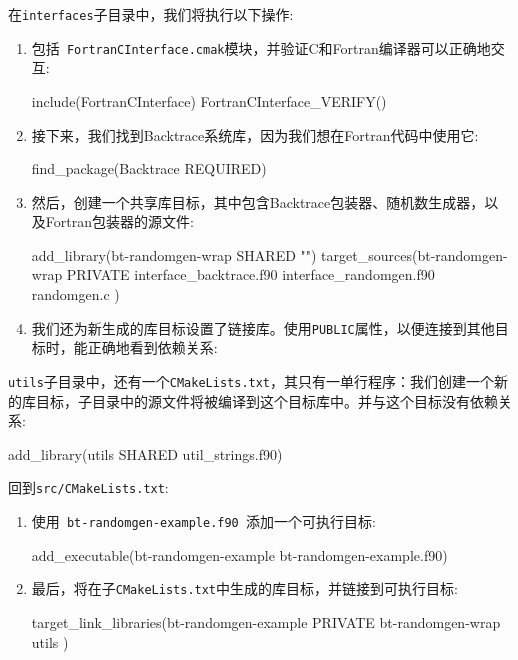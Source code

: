 在\texttt{interfaces}子目录中，我们将执行以下操作:

\begin{enumerate}
\item 包括\texttt{ FortranCInterface.cmak}模块，并验证C和Fortran编译器可以正确地交互:

\begin{codebox}[cmake]
include(FortranCInterface)
FortranCInterface_VERIFY()
\end{codebox}

\item 接下来，我们找到Backtrace系统库，因为我们想在Fortran代码中使用它:

\begin{codebox}[cmake]
find_package(Backtrace REQUIRED)
\end{codebox}

\item 然后，创建一个共享库目标，其中包含Backtrace包装器、随机数生成器，以及Fortran包装器的源文件:

\begin{codebox}[cmake]
add_library(bt-randomgen-wrap SHARED "")
target_sources(bt-randomgen-wrap
  PRIVATE
    interface_backtrace.f90
    interface_randomgen.f90
    randomgen.c
  )
\end{codebox}

\item 我们还为新生成的库目标设置了链接库。使用\texttt{PUBLIC}属性，以便连接到其他目标时，能正确地看到依赖关系:


\end{enumerate}

\texttt{utils}子目录中，还有一个\texttt{CMakeLists.txt}，其只有一单行程序：我们创建一个新的库目标，子目录中的源文件将被编译到这个目标库中。并与这个目标没有依赖关系:

\begin{codebox}[cmake]
add_library(utils SHARED util_strings.f90)
\end{codebox}

回到\texttt{src/CMakeLists.txt}:

\begin{enumerate}
\item 使用\texttt{ bt-randomgen-example.f90 }添加一个可执行目标:

\begin{codebox}[cmake]
add_executable(bt-randomgen-example bt-randomgen-example.f90)
\end{codebox}

\item 最后，将在子\texttt{CMakeLists.txt}中生成的库目标，并链接到可执行目标:

\begin{codebox}[cmake]
target_link_libraries(bt-randomgen-example
  PRIVATE
    bt-randomgen-wrap
    utils
  )
\end{codebox}

\end{enumerate}

